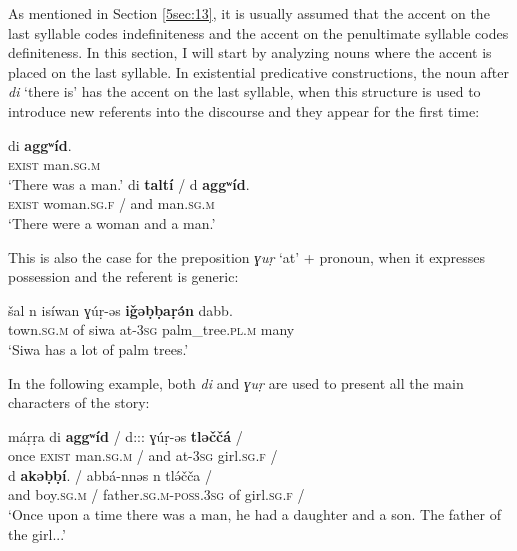 \documentclass[output=paper]{langsci/langscibook}
\begin{document}
As mentioned in Section \ref{5sec:13}, it is usually assumed that the accent on the last syllable codes indefiniteness and the accent on the penultimate syllable codes definiteness. In this section, I will start by analyzing nouns where the accent is placed on the last syllable. In existential predicative constructions, the noun after {\emph{di}} `there is' has the accent on the last syllable, when this structure is used to introduce new referents into the discourse and they appear for the first time:

\begin{exe}
\ex\label{5ex:6}
\gll	di			{\textbf{aggʷíd}}. \\
	{\textsc{exist}}		man.{\textsc{sg.m}} \\
\glt	`There was a man.'
\ex\label{5ex:7}
\gll	di			{\textbf{taltí}}		/	d	{\textbf{aggʷíd}}. \\
	{\textsc{exist}}	woman.{\textsc{sg.f}}	/	and	man.{\textsc{sg.m}} \\
\glt	`There were a woman and a man.'
\end{exe}

This is also the case for the preposition {\emph{ɣuṛ}} `at' + pronoun, when it expresses possession and the referent is generic:

\begin{exe}
\ex\label{5ex:8}
\gll	šal n isíwan ɣúṛ-əs {\textbf{iǧəḅḅaṛə́n}} dabb. \\
	town.{\textsc{sg.m}} of siwa at-{\textsc{3sg}} palm\_tree.{\textsc{pl.m}} many \\
\glt	`Siwa has a lot of palm trees.'
\end{exe}

In the following example, both {\emph{di}} and {\emph{ɣuṛ}} are used to present all the main characters of the story:

\begin{exe}
\ex\label{5ex:9}
\gll	máṛṛa di {\textbf{aggʷíd}} / d::: ɣúṛ-əs {\textbf{tləččá}} / \\
	once	{\textsc{exist}} man.{\textsc{sg.m}} /	and at-{\textsc{3sg}} girl.{\textsc{sg.f}} / \\
\glt
\exi{}
\gll	d {\textbf{akəḅḅí}}. / abbá-nnəs n tlə́čča / \\
	and boy.{\textsc{sg.m}} / father.{\textsc{sg.m-poss.3sg}} of girl.{\textsc{sg.f}} / \\
\glt	`Once upon a time there was a man, he had a daughter and a son. The father of the girl...'
\end{exe}
\end{document}
